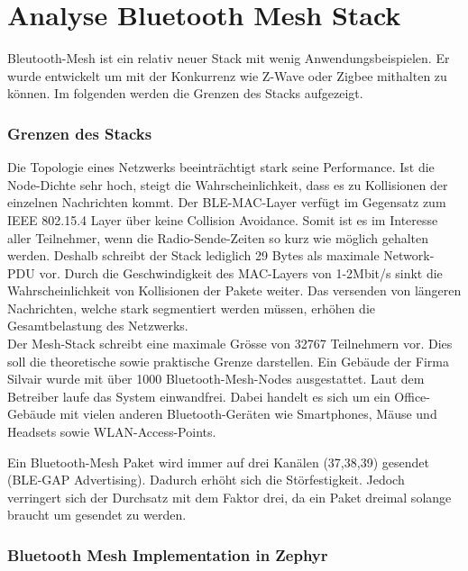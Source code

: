\clearpage
\section{Analyse Bluetooth Mesh Stack}\label{sec:AnalyseBluetoothMeshStack}

Bleutooth-Mesh ist ein relativ neuer Stack mit wenig Anwendungsbeispielen. Er wurde entwickelt um mit der Konkurrenz wie Z-Wave oder Zigbee mithalten zu können. Im folgenden werden die Grenzen des Stacks aufgezeigt.



\subsubsection{Grenzen des Stacks}\label{subsec:BLEMeshProtokollStack}

Die Topologie eines Netzwerks beeinträchtigt stark seine Performance. Ist die Node-Dichte sehr hoch, steigt die Wahrscheinlichkeit, dass es zu Kollisionen der einzelnen Nachrichten kommt. Der BLE-MAC-Layer verfügt im Gegensatz zum IEEE 802.15.4 Layer über keine Collision Avoidance. Somit ist es im Interesse aller Teilnehmer, wenn die Radio-Sende-Zeiten so kurz wie möglich gehalten werden. Deshalb schreibt der Stack lediglich 29 Bytes als maximale Network-PDU vor. Durch die Geschwindigkeit des MAC-Layers von 1-2Mbit/s sinkt die Wahrscheinlichkeit von Kollisionen der Pakete weiter. Das versenden von längeren Nachrichten, welche stark segmentiert werden müssen, erhöhen die Gesamtbelastung des Netzwerks. \cite{bluetooth_sig_mesh_netzwerk_spezifikationen_2020}\\

Der Mesh-Stack schreibt eine maximale Grösse von 32767 Teilnehmern vor. Dies soll die theoretische sowie praktische Grenze darstellen. Ein Gebäude der Firma Silvair wurde mit über 1000 Bluetooth-Mesh-Nodes ausgestattet. Laut dem Betreiber laufe das System einwandfrei. Dabei handelt es sich um ein Office-Gebäude mit vielen anderen Bluetooth-Geräten wie Smartphones, Mäuse und Headsets sowie WLAN-Access-Points.  \cite{woolley_how_bluetooth_mesh_puts_the_large__2018}

Ein Bluetooth-Mesh Paket wird immer auf drei Kanälen (37,38,39) gesendet (BLE-GAP Advertising). Dadurch erhöht sich die Störfestigkeit. Jedoch verringert sich der Durchsatz mit dem Faktor drei, da ein Paket dreimal solange braucht um gesendet zu werden. 

\subsubsection{Bluetooth Mesh Implementation in Zephyr}\label{subsec:BLEMeshProtokollStackZephyr}

